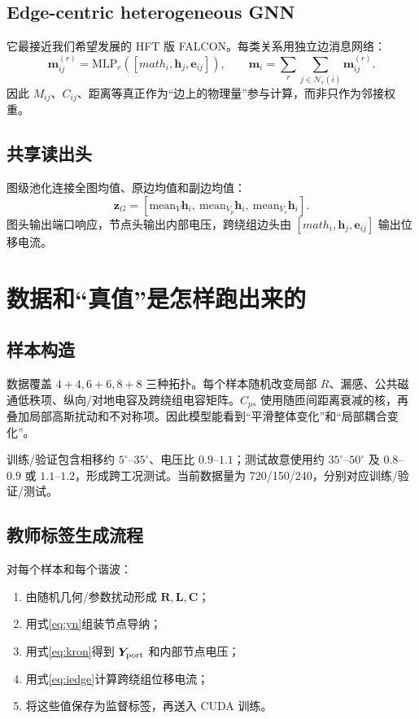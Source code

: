 \documentclass[UTF8,11pt,a4paper]{ctexart}
\newcommand{\mat}[1]{\bm{#1}}
\begin{document}
\subsection{Edge-centric heterogeneous GNN}

它最接近我们希望发展的 HFT 版 FALCON。每类关系用独立边消息网络：
\begin{equation}
 \mat m_{ij}^{(r)}=\mathrm{MLP}_r\!\left([mat h_i,\mat h_j,\mat e_{ij}]\right),
 \qquad \mat m_i=\sum_r\sum_{j\in\mathcal N_r(i)}\mat m_{ij}^{(r)}.
\end{equation}
因此 $M_{ij}$、$C_{ij}$、距离等真正作为“边上的物理量”参与计算，而非只作为邻接权重。

\subsection{共享读出头}

图级池化连接全图均值、原边均值和副边均值：
\begin{equation}
 \mat z_G=[\mathrm{mean}_{V}\mat h_i,\ \mathrm{mean}_{V_p}\mat h_i,\ \mathrm{mean}_{V_s}\mat h_i].
\end{equation}
图头输出端口响应，节点头输出内部电压，跨绕组边头由 $[mat h_i,\mat h_j,\mat e_{ij}]$ 输出位移电流。

\section{数据和“真值”是怎样跑出来的}

\subsection{样本构造}

数据覆盖 $4+4,6+6,8+8$ 三种拓扑。每个样本随机改变局部 $R$、漏感、公共磁通低秩项、纵向/对地电容及跨绕组电容矩阵。$C_{ps}$ 使用随匝间距离衰减的核，再叠加局部高斯扰动和不对称项。因此模型能看到“平滑整体变化”和“局部耦合变化”。

训练/验证包含相移约 $5^\circ$--$35^\circ$、电压比 $0.9$--$1.1$；测试故意使用约 $35^\circ$--$50^\circ$ 及 $0.8$--$0.9$ 或 $1.1$--$1.2$，形成跨工况测试。当前数据量为 720/150/240，分别对应训练/验证/测试。

\subsection{教师标签生成流程}

对每个样本和每个谐波：
\begin{enumerate}
\item 由随机几何/参数扰动形成 $\mat R,\mat L,\mat C$；
\item 用式\eqref{eq:yn}组装节点导纳；
\item 用式\eqref{eq:kron}得到 $\mat Y_{\rm port}$ 和内部节点电压；
\item 用式\eqref{eq:iedge}计算跨绕组位移电流；
\item 将这些值保存为监督标签，再送入 CUDA 训练。
\end{enumerate}
\end{document}
